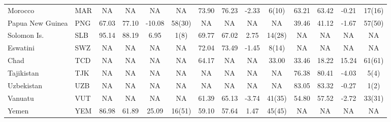 {\begin{longtable}{m{2.3cm}lcccc|cccc|cccc}
Morocco                           & MAR           & NA               & NA                 & NA               & NA               & 73.90    & 76.23      & -2.33    & 6(10)    & 63.21           & 63.42             & -0.21           & 17(16)          \\
Papua New Guinea                  & PNG           & 67.03            & 77.10              & -10.08           & 58(30)           & NA       & NA         & NA       & NA       & 39.46           & 41.12             & -1.67           & 57(50)          \\
Solomon Is.                   & SLB           & 95.14            & 88.19              & 6.95             & 1(8)             & 69.77    & 67.02      & 2.75     & 14(28)   & NA              & NA                & NA              & NA              \\
Eswatini                          & SWZ           & NA               & NA                 & NA               & NA               & 72.04    & 73.49      & -1.45    & 8(14)    & NA              & NA                & NA              & NA              \\
Chad                              & TCD           & NA               & NA                 & NA               & NA               & 64.17    & NA         & NA       & 33.00    & 33.46           & 18.22             & 15.24           & 61(61)          \\
Tajikistan                        & TJK           & NA               & NA                 & NA               & NA               & NA       & NA         & NA       & NA       & 76.38           & 80.41             & -4.03           & 5(4)            \\
Uzbekistan                        & UZB           & NA               & NA                 & NA               & NA               & NA       & NA         & NA       & NA       & 83.05           & 83.32             & -0.27           & 1(2)            \\
Vanuatu                           & VUT           & NA               & NA                 & NA               & NA               & 61.39    & 65.13      & -3.74    & 41(35)   & 54.80           & 57.52             & -2.72           & 33(31)          \\
Yemen                             & YEM           & 86.98            & 61.89              & 25.09            & 16(51)           & 59.10    & 57.64      & 1.47     & 45(45)   & NA              & NA                & NA              & NA             
  \\ \hline   \hline  
 \end{longtable}
}